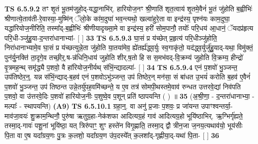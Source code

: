 \documentclass[17pt]{extarticle}
\begin{document}
                  \newline
                                \textbf{ TS 6.5.9.2} \newline
                  तꣳ शृ॒तं भू॒तम॑जुहो॒द्-यद्धा॒नाभि॑र्. हारियोज॒नꣳ श्री॒णाति॑ शृत॒त्वाय॑ शृ॒तमे॒वैनं॑ भू॒तं जु॑होति ब॒ह्वीभिः॑ श्रीणात्ये॒ताव॑ती-रे॒वास्या॒-मुष्मि॑न् ॅलो॒के का॑म॒दुघा॑ भव॒न्त्यथो॒ खल्वा॑हुरे॒ता वा इन्द्र॑स्य॒ पृश्न॑यः काम॒दुघा॒ यद्धा॑रियोज॒नीरिति॒ तस्मा᳚द्-ब॒ह्वीभिः॑ श्रीणीयादृख्सा॒मे वा इन्द्र॑स्य॒ हरी॑ सोम॒पानौ॒ तयोः᳚ परि॒धय॑ आ॒धानं॒ ॅयदप्र॑हृत्य परि॒धी-ञ्जु॑हु॒या-द॒न्तरा॑धानाभ्यां- [  ] \textbf{  33} \newline
                  \newline
                                \textbf{ TS 6.5.9.3} \newline
                  घा॒सं प्र य॑च्छेत् प्र॒हृत्य॑ परि॒धीञ्जु॑होति॒ निरा॑धानाभ्यामे॒व घा॒सं प्र य॑च्छत्युन्ने॒ता जु॑होति या॒तया॑मेव॒ ह्ये॑तर्ह्य॑द्ध्व॒र्युः स्व॒गाकृ॑तो॒ यद॑द्ध्व॒र्युर्जु॑हु॒याद्-यथा॒ विमु॑क्तं॒ पुन॑र्यु॒नक्ति॑ ता॒दृगे॒व तच्छी॒र्॒.ष-न्न॑धिनि॒धाय॑ जुहोति शीर्.ष॒तो हि स स॒मभ॑वद्-वि॒क्रम्य॑ जुहोति वि॒क्रम्य॒ हीन्द्रो॑ वृ॒त्रमह॒न्थ् समृ॑द्ध्यै प॒शवो॒ वै हा॑रियोज॒नीर्यथ् स॑भिं॒न्द्यादल्पा॑- [  ] \textbf{  34} \newline
                  \newline
                                \textbf{ TS 6.5.9.4} \newline
                  एनं प॒शवो॑ भु॒ञ्जन्त॒ उप॑तिष्ठेर॒न्॒. यन्न स॑भिं॒न्द्याद्-ब॒हव॑ एनं प॒शवोऽभु॑ञ्जन्त॒ उप॑ तिष्ठेर॒न् मन॑सा॒ सं बा॑धत उ॒भयं॑ करोति ब॒हव॑ ए॒वैनं॑ प॒शवो॑ भु॒ञ्जन्त॒ उप॑ तिष्ठन्त उन्ने॒तर्यु॑पह॒वमि॑च्छन्ते॒ य ए॒व तत्र॑ सोमपी॒थस्तमे॒वाव॑ रुन्धत उत्तरवे॒द्यां निव॑पति प॒शवो॒ वा उ॑त्तरवे॒दिः प॒शवो॑ हारियोज॒नीः प॒शुष्वे॒व प॒शून् प्रति॑ ष्ठापयन्ति ( ) ॥ \textbf{  35} \newline
                  \newline
                      (अ॒श्री॒णा॒ - द॒न्तरा॑धानाभ्या॒ - मल्पाः᳚ - स्थापयन्ति)  \textbf{(A9)} \newline \newline
                                        \textbf{ TS 6.5.10.1} \newline
                  ग्रहा॒न्॒. वा अनु॑ प्र॒जाः प॒शवः॒ प्र जा॑यन्त उपाꣳश्वन्तर्या॒-माव॑जा॒वयः॑ शु॒क्राम॒न्थिनौ॒ पुरु॑षा ऋतुग्र॒हा-नेक॑शफा आदित्यग्र॒हं गाव॑ आदित्यग्र॒हो भूयि॑ष्ठाभिर्. ऋ॒ग्भिर्गृ॑ह्यते॒ तस्मा॒द्-गावः॑ पशू॒नां भूयि॑ष्ठा॒ यत् त्रिरु॑पाꣳ॒॒ शुꣳ हस्ते॑न विगृ॒ह्णाति॒ तस्मा॒द् द्वौ त्रीन॒जा ज॒नय॒त्यथाव॑यो॒ भूय॑सीः पि॒ता वा ए॒ष यदा᳚ग्रय॒णः पु॒त्रः क॒लशो॒ यदा᳚ग्रय॒ण उ॑प॒दस्ये᳚त् क॒लशा᳚द्-गृह्णीया॒द्-यथा॑ पि॒ता- [  ] \textbf{  36} \newline
\end{document}
